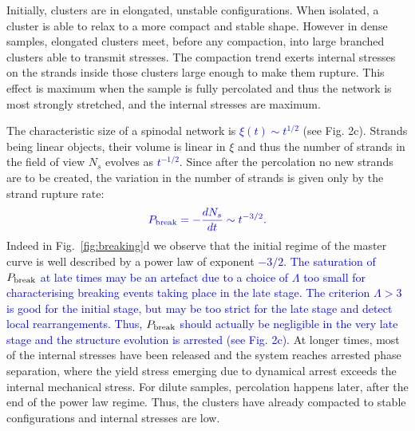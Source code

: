 \documentclass[preprint,footinbib,amsmath,amssymb]{revtex4}
\begin{document}
Initially, clusters are in elongated, unstable configurations. When isolated, a cluster is able to relax to a more compact and stable shape. However in dense samples, elongated clusters meet, before any compaction, into large branched clusters able to transmit stresses. The compaction trend exerts internal stresses on the strands inside those clusters large enough to make them rupture. This effect is maximum when the sample is fully percolated and thus the network is most strongly stretched, and the internal stresses are maximum.

The characteristic size of a spinodal network is \textcolor{blue}{$\xi(t)\sim t^{1/2}$} (see Fig. 2c). Strands being linear objects, their volume is linear in $\xi$ and thus the number of strands in the field of view $N_s$ evolves as \textcolor{blue}{$t^{-1/2}$}. Since after the percolation no new strands are to be created, the variation in the number of strands is given only by the strand rupture rate:
\begin{equation}
\textcolor{blue}{P_\text{break} = -\frac{d N_s}{dt} \sim t^{-3/2}.}
\end{equation}
Indeed in Fig.~\ref{fig:breaking}d we observe that the initial regime of the master curve is well described by a power law of exponent \textcolor{blue}{$-3/2$}. 
\textcolor{blue}{The saturation of $P_{\rm break}$ at late times may be an artefact due to a choice of $\Lambda$ too small for characterising breaking events taking place in the late stage. 
The criterion $\Lambda>3$ is good for the initial stage, but may be too strict for the late stage and detect local rearrangements. 
Thus, $P_{\rm break}$ should actually be negligible in the very late stage and the structure evolution is arrested (see Fig. 2c).} 
At longer times, most of the internal stresses have been released and the system reaches arrested phase separation, where the yield stress emerging due to dynamical arrest 
exceeds the internal mechanical stress. 
For dilute samples, percolation happens later, after the end of the power law regime. Thus, the clusters have already compacted to stable configurations and internal stresses are low.
\end{document}
